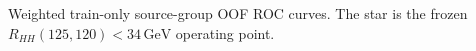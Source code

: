 Weighted train-only source-group OOF ROC curves. The star is the frozen $R_{HH}(125,120)<34\,\mathrm{GeV}$ operating point.
